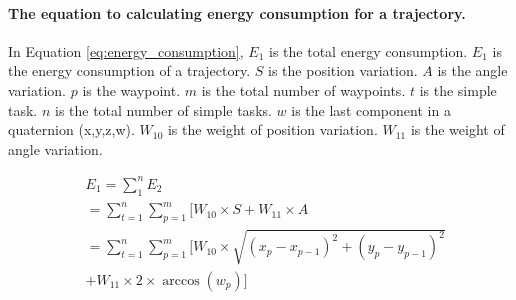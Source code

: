 \paragraph{The equation to calculating energy consumption for a trajectory.}

In Equation \ref{eq:energy_consumption}, $E_{1}$ is the total energy consumption. $E_{1}$ is the energy consumption of a trajectory.
$S$ is the position variation. $A$ is the angle variation. $p$ is the waypoint. $m$ is the total number of waypoints. $t$ is the simple task. $n$ is the total number of simple tasks. $w$ is the last component in a quaternion (x,y,z,w). $W_{10}$ is the weight of position variation. $W_{11}$ is the weight of angle variation. 


\begin{equation}
\begin{aligned}
\label{eq:energy_consumption}
& E_{1} = \sum_{1}^{n} E_{2} \\
& = \sum_{t = 1}^{n} \sum_{p = 1}^{m} [W_{10} \times S+W_{11} \times A\\
& = \sum_{t = 1}^{n} \sum_{p = 1}^{m}[ W_{10} \times \sqrt{(x_p-x_{p-1} )^2+(y_p-y_{p-1} )^2} \\
& + W_{11} \times 2 \times \arccos(w_p)] 
\end{aligned}
\end{equation}

